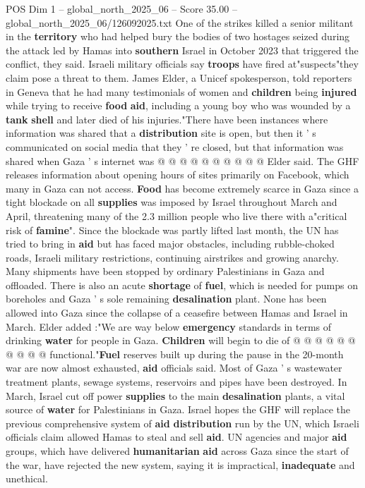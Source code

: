 \begin{textsample}{POS Dim 1 – global\_north\_2025\_06 – Score 35.00 – global\_north\_2025\_06/126092025.txt}
One of the strikes killed a senior militant in the \textbf{territory} who had helped bury the bodies of two hostages seized during the attack led by Hamas into \textbf{southern} Israel in October 2023 that triggered the conflict, they said.
Israeli military officials say \textbf{troops} have fired at"suspects"they claim pose a threat to them.
James Elder, a Unicef spokesperson, told reporters in Geneva that he had many testimonials of women and \textbf{children} being \textbf{injured} while trying to receive \textbf{food} \textbf{aid}, including a young boy who was wounded by a \textbf{tank} \textbf{shell} and later died of his injuries."There have been instances where information was shared that a \textbf{distribution} site is open, but then it ' s communicated on social media that they ' re closed, but that information was shared when Gaza ' s internet was @ @ @ @ @ @ @ @ @ @ Elder said.
The GHF releases information about opening hours of sites primarily on Facebook, which many in Gaza can not access. \textbf{Food} has become extremely scarce in Gaza since a tight blockade on all \textbf{supplies} was imposed by Israel throughout March and April, threatening many of the 2.3 million people who live there with a"critical risk of \textbf{famine}".
Since the blockade was partly lifted last month, the UN has tried to bring in \textbf{aid} but has faced major obstacles, including rubble-choked roads, Israeli military restrictions, continuing airstrikes and growing anarchy.
Many shipments have been stopped by ordinary Palestinians in Gaza and offloaded.
There is also an acute \textbf{shortage} of \textbf{fuel}, which is needed for pumps on boreholes and Gaza ' s sole remaining \textbf{desalination} plant.
None has been allowed into Gaza since the collapse of a ceasefire between Hamas and Israel in March.
Elder added :"We are way below \textbf{emergency} standards in terms of drinking \textbf{water} for people in Gaza. \textbf{Children} will begin to die of @ @ @ @ @ @ @ @ @ @ functional."\textbf{Fuel} reserves built up during the pause in the 20-month war are now almost exhausted, \textbf{aid} officials said.
Most of Gaza ' s wastewater treatment plants, sewage systems, reservoirs and pipes have been destroyed.
In March, Israel cut off power \textbf{supplies} to the main \textbf{desalination} plants, a vital source of \textbf{water} for Palestinians in Gaza.
Israel hopes the GHF will replace the previous comprehensive system of \textbf{aid} \textbf{distribution} run by the UN, which Israeli officials claim allowed Hamas to steal and sell \textbf{aid}.
UN agencies and major \textbf{aid} groups, which have delivered \textbf{humanitarian} \textbf{aid} across Gaza since the start of the war, have rejected the new system, saying it is impractical, \textbf{inadequate} and unethical.

\end{textsample}
